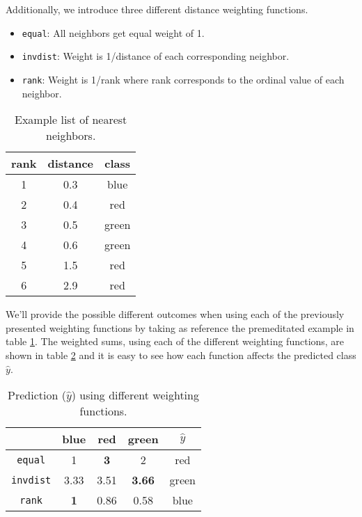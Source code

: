 Additionally, we introduce three different distance weighting functions.
\begin{itemize}
	\item \texttt{equal}: All neighbors get equal weight of 1.
	\item \texttt{invdist}: Weight is 1/distance of each corresponding neighbor.
	\item \texttt{rank}: Weight is 1/rank where rank corresponds to the ordinal value of each neighbor.
\end{itemize}
\begin{table}[h]
	\renewcommand{\arraystretch}{1.3}
	\setlength\extrarowheight{0.5pt}
	\caption{Example list of nearest neighbors.}
	\label{tbl:example}
	\centering
	\begin{tabular}{|c|c|c|}
		\hline
		rank & distance & \textbf{class} \\ \hline \hline
		1 & 0.3 & blue \\ \hline
		2 & 0.4 & red \\ \hline
		3 & 0.5 & green \\ \hline
		4 & 0.6 & green \\ \hline
		5 & 1.5 & red \\ \hline
		6 & 2.9 & red \\ \hline
	\end{tabular}
\end{table}
We'll provide the possible different outcomes when using each of the previously presented weighting functions by taking as reference the premeditated example in table \ref{tbl:example}. The weighted sums, using each of the different weighting functions, are shown in table \ref{tbl:example_res} and it is easy to see how each function affects the predicted class $\hat{y}$.
\begin{table}[h]
	\renewcommand{\arraystretch}{1.3}
	\setlength\extrarowheight{0.5pt}
	\caption{Prediction ($\hat{y}$) using different weighting functions.}
	\label{tbl:example_res}
	\centering
	\begin{tabular}{|c||c|c|c||c|}
		\hline
		& blue       & red        & green   & $\hat{y}$ \\ \hline \hline
		\texttt{equal}   & 1          & \textbf{3} & 2       & red   \\ \hline
		\texttt{invdist} & 3.33       & 3.51 & \textbf{3.66} & green \\ \hline
		\texttt{rank}    & \textbf{1} & 0.86       & 0.58    & blue  \\ \hline
	\end{tabular}
\end{table}

